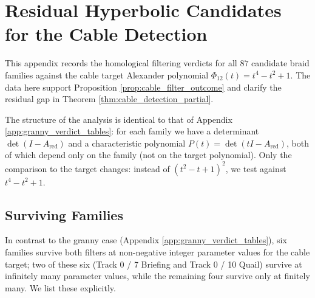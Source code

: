 \chapter{Residual Hyperbolic Candidates for the Cable Detection}\label{app:cable_residual_families}

This appendix records the homological filtering verdicts for all $87$ candidate braid families against the cable target Alexander polynomial $\Phi_{12}(t) = t^4 - t^2 + 1$. The data here support Proposition \ref{prop:cable_filter_outcome} and clarify the residual gap in Theorem \ref{thm:cable_detection_partial}.

The structure of the analysis is identical to that of Appendix \ref{app:granny_verdict_tables}: for each family we have a determinant $\det(I - A_{\text{red}})$ and a characteristic polynomial $P(t) = \det(tI - A_{\text{red}})$, both of which depend only on the family (not on the target polynomial). Only the comparison to the target changes: instead of $(t^2-t+1)^2$, we test against $t^4 - t^2 + 1$.

\section{Surviving Families}

In contrast to the granny case (Appendix \ref{app:granny_verdict_tables}), six families survive both filters at non-negative integer parameter values for the cable target; two of these six (Track 0 / 7 Briefing and Track 0 / 10 Quail) survive at infinitely many parameter values, while the remaining four survive only at finitely many. We list these explicitly.

